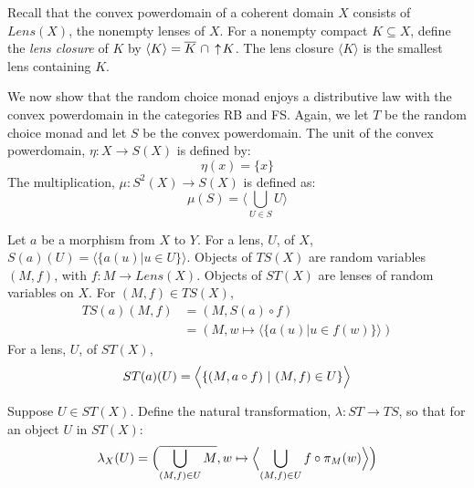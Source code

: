 Recall that the convex powerdomain of a coherent domain $X$ consists of $Lens(X)$, the nonempty lenses of $X$.  For a nonempty compact $K\subseteq X$, define the \emph{lens closure} of $K$ by $\langle K\rangle = \overline{K}\ \cap \,\uparrow\! K$.  The lens closure 
$\langle K\rangle$ is the smallest lens containing $K$.

We now show that the random choice monad enjoys a distributive law with the convex powerdomain in the categories \textsf{RB} and \textsf{FS}.  Again, we let $T$ be the random choice monad and let $S$ be the convex powerdomain.  The unit of the convex powerdomain, $\eta:X\to S(X)$ is defined by: \[\eta(x) = \{x\}\]
The multiplication, $\mu:S^2(X)\to S(X)$ is defined as: \[\mu(S) = \langle \bigcup_{U\in S} U\rangle\]

Let $a$ be a morphism from $X$ to $Y$.  For a lens, $U$, of $X$, $S(a)(U) = \langle\{a(u)|u\in U\}\rangle$.  Objects of $TS(X)$ are random variables $(M,f)$, with $f:M\to Lens(X)$.  Objects of $ST(X)$ are lenses of random variables on $X$.  For $(M,f) \in TS(X)$, 
\begin{align*}
TS(a)(M,f) &= (M,S(a)\circ f) \\
&= (M, w\mapsto \langle\{a(u)|u\in f(w)\}\rangle)
\end{align*}
For a lens, $U$, of $ST(X)$, \[ST(a)(U) = \Bigl\langle \{(M,a\circ f)\ |\ (M,f)\in U\}\Bigr\rangle\]

Suppose $U \in ST(X)$.  Define the natural transformation,
$\lambda : ST\rightarrow TS$, so that for an object $U$ in $ST(X)$:
\[\lambda_X (U) = \Bigl(\overline{\bigcup_{(M,f)\in U} M}, w\mapsto\Bigl\langle\bigcup_{(M,f)\in U} f\circ \pi_M(w) \Bigr\rangle\Bigr)\]

